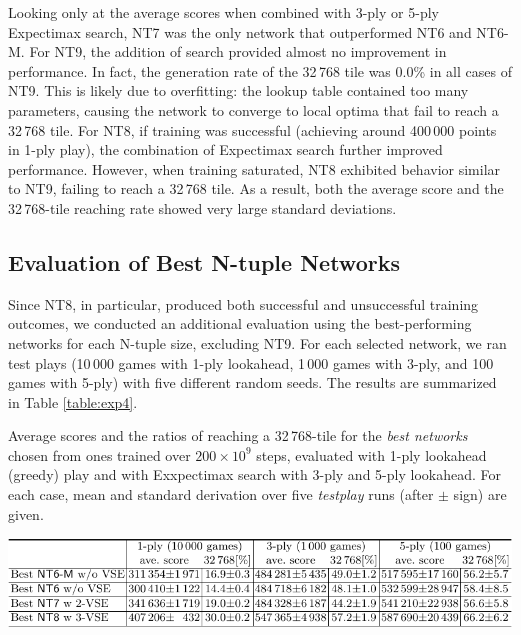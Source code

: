 Looking only at the average scores when combined with 3-ply or 5-ply Expectimax search, \textsf{NT7} was the only network that outperformed \textsf{NT6} and \textsf{NT6-M}.
For \textsf{NT9}, the addition of search provided almost no improvement in performance. In fact, the generation rate of the 32\,768 tile was 0.0\% in all cases of \textsf{NT9}. This is likely due to overfitting: the lookup table contained too many parameters, causing the network to converge to local optima that fail to reach a 32\,768 tile.
For \textsf{NT8}, if training was successful (achieving around 400\,000 points in 1-ply play), the combination of Expectimax search further improved performance. However, when training saturated, \textsf{NT8} exhibited behavior similar to \textsf{NT9}, failing to reach a 32\,768 tile. As a result, both the average score and the 32\,768-tile reaching rate showed very large standard deviations.

\subsection{Evaluation of Best N-tuple Networks}



Since \textsf{NT8}, in particular, produced both successful and unsuccessful training outcomes, we conducted an additional evaluation using the best-performing networks for each N-tuple size, excluding \textsf{NT9}.
For each selected network, we ran test plays (10\,000 games with 1-ply lookahead, 1\,000 games with 3-ply, and 100 games with 5-ply) with five different random seeds.
The results are summarized in Table \ref{table:exp4}.

\begin{table}
 \caption{Average scores and the ratios of reaching a 32\,768-tile for the \emph{best networks} chosen from ones trained over $200\times 10^9$ steps, evaluated with 1-ply lookahead (greedy) play and with Exxpectimax search with 3-ply and 5-ply lookahead. For each case, mean and standard derivation over five \emph{testplay} runs (after $\pm$ sign) are given.}
 \label{table:exp4}
 \centering\includegraphics[width=.99\linewidth]{figures/table-exp4.pdf}
\end{table}

